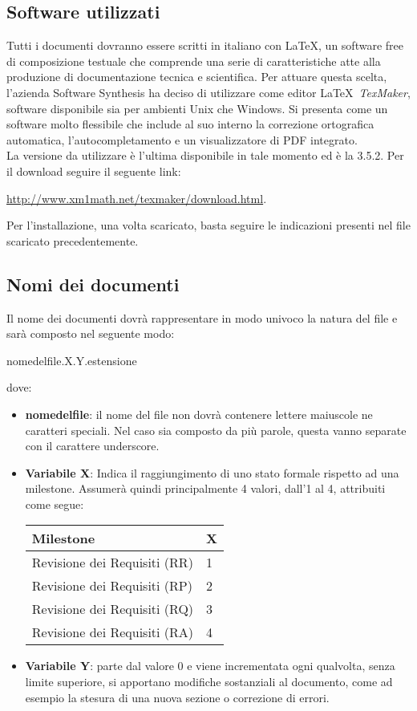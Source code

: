\subsection{Software utilizzati}
Tutti i documenti dovranno essere scritti in italiano con \LaTeX, un software free di composizione testuale che comprende una serie di caratteristiche atte alla produzione di documentazione tecnica e scientifica.
\newline
Per attuare questa scelta, l'azienda Software Synthesis ha deciso di utilizzare come editor \LaTeX \ \textit{TexMaker}, software disponibile sia per ambienti Unix che Windows. Si presenta come un software molto flessibile che include al suo interno la correzione ortografica automatica, l'autocompletamento e un visualizzatore di PDF integrato.\\
La versione da utilizzare è l'ultima disponibile in tale momento ed è la 3.5.2. Per il download seguire il seguente link:
\begin{center}
\url{http://www.xm1math.net/texmaker/download.html}.
\end{center}
Per l'installazione, una volta scaricato, basta seguire le indicazioni presenti nel file scaricato precedentemente.
\subsection{Nomi dei documenti}
\label{sec:nomi_documenti}
Il nome dei documenti dovrà rappresentare in modo univoco la natura del file e sarà composto nel seguente modo:
\begin{center}
nome\textunderscore del\textunderscore file.X.Y.estensione
\end{center}
dove:
\begin{itemize}
\item \textbf{nome\textunderscore del\textunderscore file}: il nome del file non dovrà contenere lettere maiuscole ne caratteri speciali. Nel caso sia composto da più parole, questa vanno separate con il carattere underscore.
\item \textbf{Variabile X}: Indica il raggiungimento di uno stato formale rispetto ad una milestone. Assumerà quindi principalmente 4 valori, dall'1 al 4, attribuiti come segue:
\begin{center}
\begin{tabular}{l|l}
\toprule
Milestone & X\\
\midrule
Revisione dei Requisiti (RR) & 1\\
Revisione dei Requisiti (RP) & 2\\
Revisione dei Requisiti (RQ) & 3\\
Revisione dei Requisiti (RA) & 4\\
\bottomrule
\end{tabular}
\end{center}
\item \textbf{Variabile Y}: parte dal valore 0 e viene incrementata ogni qualvolta, senza limite superiore, si apportano modifiche sostanziali al documento, come ad esempio la stesura di una nuova sezione o correzione di errori.
\end{itemize}

